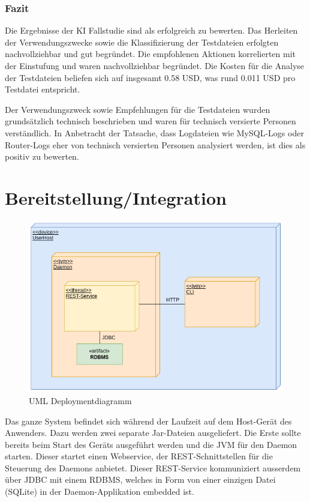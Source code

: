 \documentclass[a4paper,12pt]{report}
\begin{document}
    \subsection{Fazit}\label{subsec:diskussion}
    Die Ergebnisse der KI Fallstudie sind als erfolgreich zu bewerten.
    Das Herleiten der Verwendungszwecke sowie die Klassifizierung der Testdateien erfolgten nachvollziehbar und gut begründet.
    Die empfohlenen Aktionen korrelierten mit der Einstufung und waren nachvollziehbar begründet.
    Die Kosten für die Analyse der Testdateien beliefen sich auf insgesamt 0.58 USD, was rund 0.011 USD pro Testdatei entspricht.

    Der Verwendungszweck sowie Empfehlungen für die Testdateien wurden grundsätzlich technisch beschrieben und waren für technisch versierte Personen verständlich.
    In Anbetracht der Tatsache, dass Logdateien wie MySQL-Logs oder Router-Logs eher von technisch versierten Personen analysiert werden, ist dies als positiv zu bewerten.

    \clearpage


    \chapter{Bereitstellung/Integration}\label{chap:bereitstellung-integration}

    \begin{figure}[h]
        \centering
        \includegraphics[width=1\textwidth]{assets/DeplDiagram}
        \caption{UML Deploymentdiagramm}
        \label{fig:depl-diag}
    \end{figure}

    Das ganze System befindet sich während der Laufzeit auf dem Host-Gerät des Anwenders.
    Dazu werden zwei separate Jar-Dateien ausgeliefert.
    Die Erste sollte bereits beim Start des Geräts ausgeführt werden und die JVM für den Daemon starten.
    Dieser startet einen Webservice, der REST-Schnittstellen für die Steuerung des Daemons anbietet.
    Dieser REST-Service kommuniziert ausserdem über JDBC mit einem RDBMS, welches in Form von einer einzigen Datei (SQLite)
    in der Daemon-Applikation embedded ist.
\end{document}
